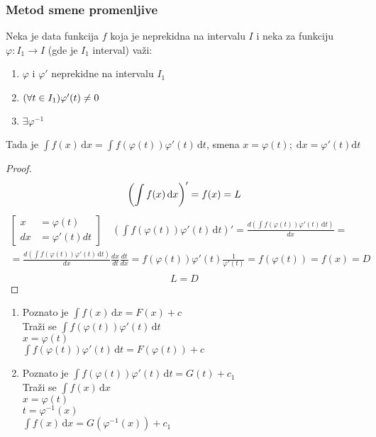 \subsubsection{Metod smene promenljive}
	\begin{theorem}
		Neka je data funkcija $f$ koja je neprekidna na intervalu $I$ i neka za funkciju $\varphi : I_1 \to I$ (gde je $I_1$ interval) važi:
		\begin{enumerate} 
			\item $\varphi$ i $\varphi'$ neprekidne na intervalu $I_1$
			\item $(\forall t \in I_1) \varphi' (t) \centernot = 0$
			\item $\exists \varphi^{-1}$
		\end{enumerate}		 
	 	Tada je $\int f(x) \, \mathrm{d}x = \int f(\varphi (t)) \varphi'(t)\, \mathrm{d}t$, smena $x = \varphi(t); \; \mathrm{d}x = \varphi'(t)\mathrm{d}t$
	\end{theorem}
	\begin{proof}
		$$\left(\int f(x)\, \mathrm{d}x \right)' = f(x) = L\\$$
		\begin{multline*}
			\left[
			\begin{aligned}
				x &= \varphi(t)\\
				dx &= \varphi'(t)dt
			\end{aligned}
			\right] \quad
			\left(\int f(\varphi (t))\varphi ' (t) \, \mathrm{d}t\right)'  
			=\frac{d\left(\int f(\varphi (t))\varphi'(t)\, \mathrm{d}t\right)}{dx} = \\
			=\frac{d\left(\int f(\varphi (t))\varphi'(t)\, \mathrm{d}t\right)}{dx}\frac{dx}{dt}\frac{dt}{dx} =
			f(\varphi (t))\varphi'(t)\frac{1}{\varphi'(t)} = 
			f(\varphi(t)) = f(x) = D\\
		\end{multline*}
		$$L = D$$
	\end{proof}
	
	\begin{corollary}
		\begin{enumerate}[label = \arabic*)]
			\item 
				Poznato je $\int f(x)\, \mathrm{d}x = F(x) + c$\\
				Traži se $\int f(\varphi (t))\varphi'(t)\, \mathrm{d}t$\\
				$x = \varphi(t)$\\
				$\int f(\varphi(t))\varphi'(t)\, \mathrm{d}t = F(\varphi(t))+c$
			\item 
				Poznato je $\int f(\varphi(t))\varphi'(t)\, \mathrm{d}t = G(t) + c_1$\\			
				Traži se $\int f(x)\, \mathrm{d}x$\\
				$x = \varphi(t)$\\
				$t = \varphi^{-1}(x)$\\
				$\int f(x)\, \mathrm{d}x = G(\varphi^{-1}(x))+c_1$
		\end{enumerate}
	\end{corollary}
	
